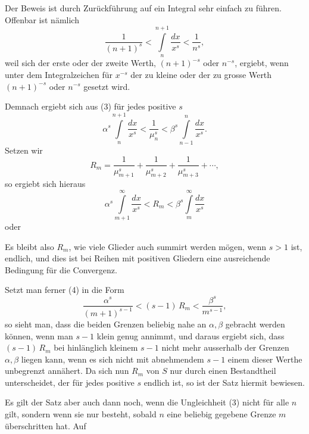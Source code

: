 Der Beweis ist durch Zurückführung auf ein Integral sehr einfach zu führen. Offenbar ist nämlich
\[
\frac{1}{(n+1)^s} < \int\limits_n^{n+1} \frac{dx}{x^s} < \frac{1}{n^s},
\]
weil sich der erste oder der zweite Werth, $(n+1)^{-s}$ oder $n^{-s}$, ergiebt, wenn unter dem Integralzeichen für $x^{-s}$ der zu kleine oder der zu grosse Werth $(n+1)^{-s}$ oder $n^{-s}$ gesetzt wird.

Demnach ergiebt sich aus (3) für jedes positive $s$
\[
\alpha^s \int\limits_n^{n+1} \frac{dx}{x^s} < \frac{1}{\mu_n^s} < \beta^s \int\limits_{n-1}^n \frac{dx}{x^s}.
\]
Setzen wir
\[
R_m = \frac{1}{\mu_{m+1}^s} + \frac{1}{\mu_{m+2}^s} + \frac{1}{\mu_{m+3}^s} + \cdots,
\]
so ergiebt sich hieraus
\[
\alpha^s \int\limits_{m+1}^{\infty} \frac{dx}{x^s} < R_m < \beta^s \int\limits_m^{\infty} \frac{dx}{x^s}
\]
oder

Es bleibt also $R_m$, wie viele Glieder auch summirt werden mögen, wenn $s > 1$ ist, endlich, und dies ist bei Reihen mit positiven Gliedern eine ausreichende Bedingung für die Convergenz.

Setzt man ferner (4) in die Form
\[
\frac{\alpha^s}{(m+1)^{s-1}} < (s-1)\,R_m < \frac{\beta^s}{m^{s-1}},
\]
so sieht man, dass die beiden Grenzen beliebig nahe an $\alpha, \beta$ gebracht werden können, wenn man $s-1$ klein genug annimmt, und daraus ergiebt sich, dass $(s-1)\,R_m$ bei hinlänglich kleinem $s-1$ nicht mehr ausserhalb der Grenzen $\alpha, \beta$ liegen kann, wenn es sich nicht mit abnehmendem $s-1$ einem dieser Werthe unbegrenzt annähert. Da sich nun $R_m$ von $S$ nur durch einen Bestandtheil unterscheidet, der für jedes positive $s$ endlich ist, so ist der Satz hiermit bewiesen.

Es gilt der Satz aber auch dann noch, wenn die Ungleichheit (3) nicht für alle $n$ gilt, sondern wenn sie nur besteht, sobald $n$ eine beliebig gegebene Grenze $m$ überschritten hat. Auf
